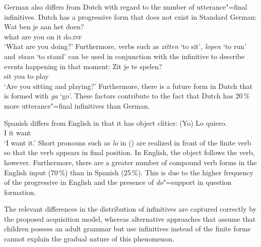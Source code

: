 German also differs from Dutch with regard to the number of utterance"=final infinitives. Dutch has a progressive form
that does not exist in Standard German:
\ea
\gll Wat ben je aan het doen?\\
     what are you on it do.\textsc{inf}\\
\glt `What are you doing?'
\z
Furthermore, verbs such as \emph{zitten} `to sit', \emph{lopen} `to run' and \emph{staan}
`to stand' can be used in conjunction with the infinitive to describe events happening in that moment:
\ea
\gll Zit je te spelen?\\
     sit you to play\\
\glt `Are you sitting and playing?' 
\z
Furthermore, there is a future form in Dutch that is formed with \emph{ga} `go'. These factors
contribute to the fact that Dutch has 20\,\% more utterance"=final infinitives than German.

Spanish differs from English in that it has object clitics:
\ea
\gll (Yo) Lo quiero.\\
     I it want\\
\glt `I want it.'
\z
Short pronouns such as \emph{lo} in () are realized in front of the finite verb so that the verb
appears in final position. In English, the object follows the verb, however. Furthermore, there are
a greater number of compound verb forms in the English input (70\,\%) than in Spanish (25\,\%).
This is due to the higher frequency of the progressive in English and the
presence of \emph{do}"=support in question formation.

The relevant differences in the distribution of infinitives are captured correctly by the proposed acquisition model,
whereas alternative approaches that assume that children possess an adult grammar but use infinitives
instead of the finite forms cannot explain the gradual nature of this phenomenon.

